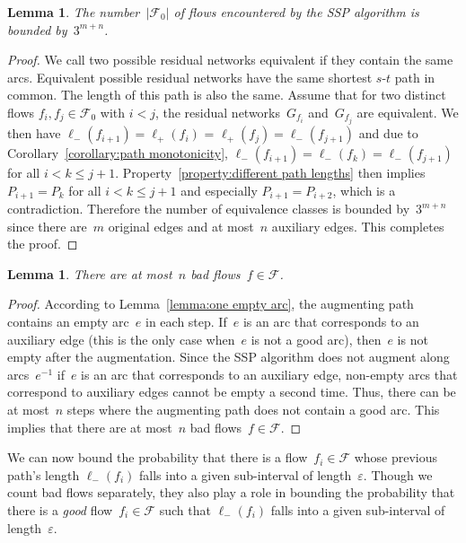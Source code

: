 \documentclass[11pt]{article}
\newtheorem{lemma}[theorem]{Lemma}
\newcommand{\F}{\mathcal{F}}
\newcommand{\e}{\varepsilon}
\renewcommand{\sp}{\ell}
\newcommand{\spm}[1][]{\sp^{#1}_{-}}
\newcommand{\spp}[1][]{\sp^{#1}_{+}}
\begin{document}
\begin{lemma}
\label{lemma:worst case number}
The number~$|\F_0|$ of flows encountered by the SSP algorithm is bounded by~$3^{m+n}$. 
\end{lemma}

\begin{proof}
We call two possible residual networks equivalent if they contain the same arcs. Equivalent possible residual networks have the same shortest $s$-$t$ path in common. The length of this path is also the same. Assume that for two distinct flows $f_i, f_j \in \F_0$ with $i < j$, the residual networks~$G_{f_i}$ and~$G_{f_j}$ are equivalent. We then have $\spm(f_{i+1}) = \spp(f_i)$ = $\spp(f_j) =\spm(f_{j+1})$ and due to Corollary~\ref{corollary:path monotonicity}, $\spm(f_{i+1}) = \spm(f_k) =\spm(f_{j+1})$ for all $i < k \leq j+1$. Property~\ref{property:different path lengths} then implies $P_{i+1} = P_k$ for all $i < k \leq j+1$ and especially $P_{i+1} = P_{i+2}$, which is a contradiction. Therefore the number of equivalence classes is bounded by~$3^{m+n}$ since there are~$m$ original edges and at most~$n$ auxiliary edges. This completes the proof. \end{proof}

\begin{lemma}
\label{lemma:upper bound bad flows}
There are at most~$n$ bad flows~$f \in \F$.
\end{lemma}

\begin{proof}
According to Lemma~\ref{lemma:one empty arc}, the augmenting path contains an empty arc~$e$
in each step. If~$e$ is an arc that corresponds to an auxiliary edge (this is the only case when~$e$ is not a good arc), then~$e$ is not empty after the augmentation. Since the SSP algorithm does not augment along arcs~$e^{-1}$ if~$e$ is an arc that corresponds to an auxiliary edge, non-empty arcs that correspond to auxiliary edges cannot be empty a second time. Thus, there can be at most~$n$ steps where the augmenting path does not contain a good arc. This implies that there are at most~$n$ bad flows~$f \in \F$. \end{proof}

We can now bound the probability that there is a flow~$f_i \in \F$ whose previous path's length $\spm(f_i)$ falls into a given sub-interval of length~$\e$. Though we count bad flows separately, they also play a role in bounding the probability that there is a \emph{good} flow~$f_i \in \F$ such that $\spm(f_i)$ falls into a given sub-interval of length~$\e$.
\end{document}
